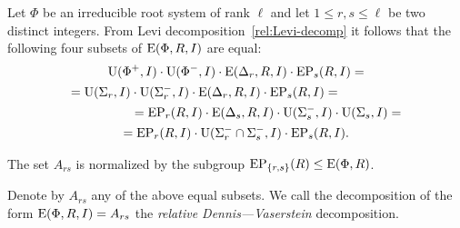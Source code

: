 Let $\Phi$ be an irreducible root system of rank $\ell$ and let $1\leq r,s \leq \ell$ be two distinct integers.
From Levi decomposition~\ref{rel:Levi-decomp} it follows that the following four subsets of $\operatorname{E}(\Phi, R, I)$ are equal:
\begin{multline*}
\operatorname{U}(\Phi^+, I)\cdot \operatorname{U}(\Phi^-, I) \cdot \operatorname{E}(\Delta_r, R, I) \cdot \operatorname{EP}_s(R, I) = \\
= \operatorname{U}(\Sigma_r, I)\cdot \operatorname{U}(\Sigma^-_r, I) \cdot \operatorname{E}(\Delta_r, R, I) \cdot \operatorname{EP}_s(R, I) = \hspace{5em} \\
\hspace{5em} = \operatorname{EP}_r(R, I) \cdot \operatorname{E}(\Delta_s, R, I) \cdot \operatorname{U}(\Sigma_s^-, I)\cdot \operatorname{U}(\Sigma_s, I) = \\
= \operatorname{EP}_r(R, I) \cdot \operatorname{U}(\Sigma^-_r\cap \Sigma^-_s, I) \cdot \operatorname{EP}_s(R, I).
\end{multline*}

\begin{lemma}\label{lemma:dv-normal} The set $A_{rs}$ is normalized by the subgroup $\operatorname{EP}_{\{r,s\}}(R) \leq \operatorname{E}(\Phi, R)$. \end{lemma}

\begin{dfn}
 Denote by $A_{rs}$ any of the above equal subsets.
 We call the decomposition of the form $\operatorname{E}(\Phi, R, I) = A_{rs}$ the {\it relative Dennis---Vaserstein} decomposition.
\end{dfn}


